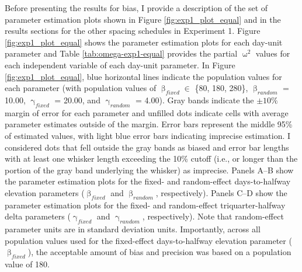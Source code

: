 \documentclass[
12pt, %
twoside,
english]{guelphthesis}
\theoremstyle{definition}
\theoremstyle{definition}
\theoremstyle{definition}
\theoremstyle{definition}
\theoremstyle{remark}
\begin{document}
Before presenting the results for bias, I provide a description of the set of parameter estimation plots shown in Figure \ref{fig:exp1_plot_equal} and in the results sections for the other spacing schedules in Experiment 1. Figure \ref{fig:exp1_plot_equal} shows the parameter estimation plots for each day-unit parameter and Table \ref{tab:omega-exp1-equal} provides the partial \(\upomega^2\) values for each independent variable of each day-unit parameter. In Figure \ref{fig:exp1_plot_equal}, blue horizontal lines indicate the population values for each parameter (with population values of \(\upbeta_{fixed} \in\) \{80, 180, 280\}, \(\upbeta_{random}\) = 10.00, \(\upgamma_{fixed}\) = 20.00, and \(\upgamma_{random}\) = 4.00). Gray bands indicate the \(\pm 10\%\) margin of error for each parameter and unfilled dots indicate cells with average parameter estimates outside of the margin. Error bars represent the middle 95\% of estimated values, with light blue error bars indicating imprecise estimation. I considered dots that fell outside the gray bands as biased and error bar lengths with at least one whisker length exceeding the 10\% cutoff (i.e., or longer than the portion of the gray band underlying the whisker) as imprecise. Panels A--B show the parameter estimation plots for the fixed- and random-effect days-to-halfway elevation parameters (\(\upbeta_{fixed}\) and \(\upbeta_{random}\), respectively). Panels C--D show the parameter estimation plots for the fixed- and random-effect triquarter-halfway delta parameters (\(\upgamma_{fixed}\) and \(\upgamma_{random}\), respectively). Note that random-effect parameter units are in standard deviation units. Importantly, across all population values used for the fixed-effect days-to-halfway elevation parameter (\(\upbeta_{fixed}\)), the acceptable amount of bias and precision was based on a population value of 180.
\end{document}
